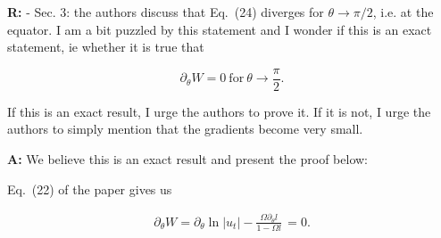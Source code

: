 \documentclass{article}
\begin{document}
\bigskip

{\bf R:} - Sec. 3: the authors discuss that Eq.~(24) diverges for $\theta \rightarrow \pi/2$,
i.e. at the equator. I am a bit puzzled by this statement and I wonder if
this is an exact statement, ie whether it is true that

\begin{equation}
\partial_{\theta} W = 0 \ \mathrm{for} \ \theta \rightarrow \frac{\pi}{2}.
\end{equation}

If this is an exact result, I urge the authors to prove it. If it is
not, I urge the authors to simply mention that the gradients become
very small.

\bigskip

{\bf A:} We believe this is an exact result and present the proof below:

\bigskip

Eq.~(22) of the paper gives us

\begin{eqnarray*}
\partial_{\theta} W = \partial_{\theta} \ln|u_t| - \frac{\Omega \partial_{\theta}l}{1 - \Omega l}\, = 0.
\end{eqnarray*}
\end{document}
